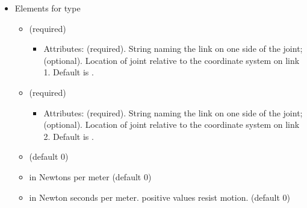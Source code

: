 \begin{itemize}
\begin{itemize}
\item Elements for type 
\begin{itemize}
\item {} (required)  
\begin{itemize}
\item Attributes:  (required). String naming the link on
  one side of the joint;  (optional). Location of joint relative to the coordinate system on link 1. Default is .
\end{itemize}
\item {} (required)
\begin{itemize}
\item Attributes:  (required). String naming the link on
  one side of the joint;  (optional). Location of joint relative to the coordinate system on link 2. Default is .
\end{itemize}
\item {} (default 0)
\item {} in Newtons per meter (default 0)
\item {} in Newton seconds per meter.  positive values
  resist motion.  (default 0)
\end{itemize}


\end{itemize}
\end{itemize}
